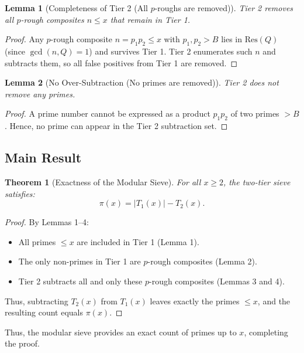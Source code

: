 \documentclass[11pt]{article}
\newtheorem{lemma}{Lemma}
\newtheorem{theorem}{Theorem}
\begin{document}
	\begin{lemma}[Completeness of Tier 2 (All $p$-roughs are removed)]
		Tier 2 removes all $p$-rough composites $n \leq x$ that remain in Tier 1.
	\end{lemma}
	
	\begin{proof}
		Any $p$-rough composite $n = p_1 p_2 \leq x$ with $p_1, p_2 > B$ lies in $\text{Res}(Q)$ (since $\gcd(n, Q) = 1$) and survives Tier 1.  
		Tier 2 enumerates such $n$ and subtracts them, so all false positives from Tier 1 are removed.
	\end{proof}
	
	\begin{lemma}[No Over-Subtraction (No primes are removed)]
		Tier 2 does not remove any primes.
	\end{lemma}
	
	\begin{proof}
		A prime number cannot be expressed as a product $p_1 p_2$ of two primes $> B$.  
		Hence, no prime can appear in the Tier 2 subtraction set.
	\end{proof}
	
	\subsection{Main Result}
	
	\begin{theorem}[Exactness of the Modular Sieve]
		For all $x \geq 2$, the two-tier sieve satisfies:
		\[
		\pi(x) = |T_1(x)| - T_2(x).
		\]
	\end{theorem}
	
	\begin{proof}
		By Lemmas 1–4:
		\begin{itemize}
			\item All primes $\leq x$ are included in Tier 1 (Lemma 1).
			\item The only non-primes in Tier 1 are $p$-rough composites (Lemma 2).
			\item Tier 2 subtracts all and only these $p$-rough composites (Lemmas 3 and 4).
		\end{itemize}
		Thus, subtracting $T_2(x)$ from $T_1(x)$ leaves exactly the primes $\leq x$, and the resulting count equals $\pi(x)$. \qedhere
	\end{proof}
	
	Thus, the modular sieve provides an exact count of primes up to $x$, completing the proof.
	
	
	
\end{document}
